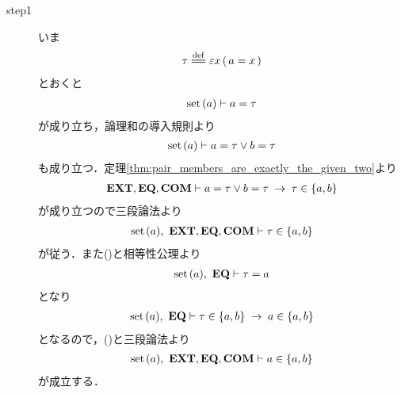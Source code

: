 	\begin{sketch}\mbox{}
		\begin{description}
			\item[step1]
				いま
				\begin{align}
					\tau \defeq \varepsilon x\, (\, a = x\, )
				\end{align}
				とおくと
				\begin{align}
					\operatorname*{set}\hspace{0.15em}(a) \vdash a = \tau
					\label{fom:set_is_an_element_of_its_pair_1}
				\end{align}
				が成り立ち，論理和の導入規則より
				\begin{align}
					\operatorname*{set}\hspace{0.15em}(a) \vdash a = \tau \vee b = \tau
				\end{align}
				も成り立つ．定理\ref{thm:pair_members_are_exactly_the_given_two}より
				\begin{align}
					\mbox{{\bf EXT}},\mbox{{\bf EQ}},\mbox{\bf COM} \vdash 
					a = \tau \vee b = \tau \hspace{0.25em}\rightarrow\hspace{0.25em} \tau \in \{a,b\}
				\end{align}
				が成り立つので三段論法より
				\begin{align}
					\operatorname*{set}\hspace{0.15em}(a),\ \mbox{{\bf EXT}},\mbox{{\bf EQ}},\mbox{\bf COM} \vdash \tau \in \{a,b\}
					\label{fom:set_is_an_element_of_its_pair_2}
				\end{align}
				が従う．また()と相等性公理より
				\begin{align}
					\operatorname*{set}\hspace{0.15em}(a),\ \mbox{{\bf EQ}} \vdash \tau = a
				\end{align}
				となり
				\begin{align}
					\operatorname*{set}\hspace{0.15em}(a),\ \mbox{{\bf EQ}} \vdash \tau \in \{a,b\} \hspace{0.25em}\rightarrow\hspace{0.25em} a \in \{a,b\}
				\end{align}
				となるので，()と三段論法より
				\begin{align}
					\operatorname*{set}\hspace{0.15em}(a),\ \mbox{{\bf EXT}},\mbox{{\bf EQ}},\mbox{\bf COM} \vdash a \in \{a,b\}
				\end{align}
				が成立する．
			

\end{description}
\end{sketch}
